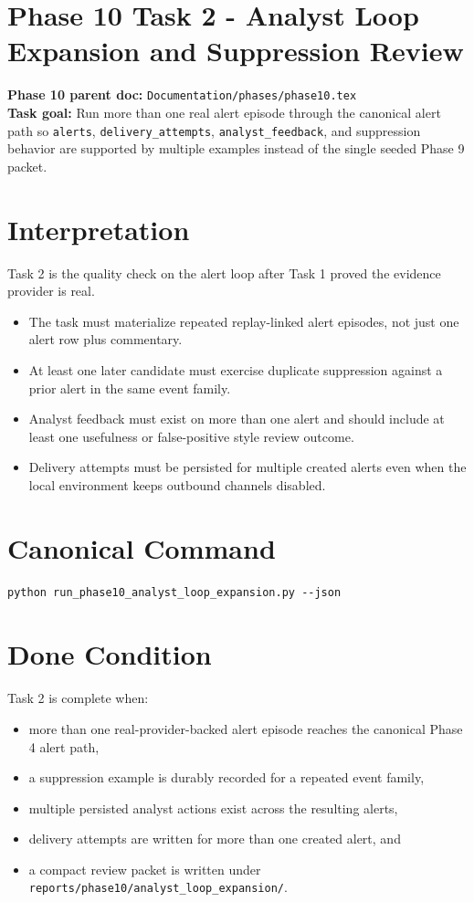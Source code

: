 \documentclass{article}
\begin{document}
\section*{Phase 10 Task 2 - Analyst Loop Expansion and Suppression Review}

\textbf{Phase 10 parent doc:} \texttt{Documentation/phases/phase10.tex}\\
\textbf{Task goal:} Run more than one real alert episode through the canonical alert path so \texttt{alerts}, \texttt{delivery\_attempts}, \texttt{analyst\_feedback}, and suppression behavior are supported by multiple examples instead of the single seeded Phase 9 packet.

\section*{Interpretation}
Task 2 is the quality check on the alert loop after Task 1 proved the evidence provider is real.
\begin{itemize}
\item The task must materialize repeated replay-linked alert episodes, not just one alert row plus commentary.
\item At least one later candidate must exercise duplicate suppression against a prior alert in the same event family.
\item Analyst feedback must exist on more than one alert and should include at least one usefulness or false-positive style review outcome.
\item Delivery attempts must be persisted for multiple created alerts even when the local environment keeps outbound channels disabled.
\end{itemize}

\section*{Canonical Command}
\begin{verbatim}
python run_phase10_analyst_loop_expansion.py --json
\end{verbatim}

\section*{Done Condition}
Task 2 is complete when:
\begin{itemize}
\item more than one real-provider-backed alert episode reaches the canonical Phase 4 alert path,
\item a suppression example is durably recorded for a repeated event family,
\item multiple persisted analyst actions exist across the resulting alerts,
\item delivery attempts are written for more than one created alert, and
\item a compact review packet is written under \texttt{reports/phase10/analyst\_loop\_expansion/}.
\end{itemize}
\end{document}
